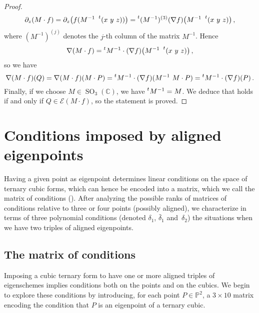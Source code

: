 \documentclass{amsart}
\theoremstyle{plain}
\theoremstyle{definition}
\newcommand{\C}{\mathbb{C}}
\newcommand{\p}{\mathbb{P}}
\newcommand{\SO}{\operatorname{SO}}
\newcommand{\Eig}[1]{\mathcal{E}\!\left( {#1} \right)}
\begin{document}
\begin{proof}
\begin{gather*}
  \partial_z (M\cdot f) = \partial_z \bigl( f(M^{-1} \ \prescript{t} {} (x \ y \ z)) \bigr) = \prescript{t} {}(M^{-1})^{(3)}(\nabla f) \bigl( M^{-1}\ \prescript{t} {} (x \ y \ z) \bigr) \,,
\end{gather*}
%
where $(M^{-1})^{(j)}$ denotes the $j$-th column of the matrix $M^{-1}$. Hence
%
\[
  \nabla (M \cdot f) = \prescript{t} {} M^{-1} \cdot (\nabla f) \bigl(M^{-1}\ \prescript{t} {} (x \ y \ z)\bigr) \,,
\]
%
so we have
%
\[
  \nabla (M \cdot f)(Q)=\nabla (M \cdot f)(M \cdot P)=
  \prescript{t} {} M^{-1} \cdot (\nabla f) (M^{-1}\ M \cdot P)=\prescript{t} {} M^{-1} \cdot (\nabla f)(P) \,.
\]
%
Finally, if we choose $M \in \SO_3(\C)$, we have
$\prescript{t} {} M^{-1}=M$. We deduce that
 holds if and only if $Q \in \Eig{M\cdot f}$, so the statement is proved.
\end{proof}


\section{Conditions imposed by aligned eigenpoints}
\label{conditions}

Having a given point as eigenpoint determines linear conditions on the space of ternary cubic forms, which can hence be encoded into a matrix, which we call the matrix of conditions (). 
After analyzing the possible ranks of matrices of conditions relative to three or four points (possibly aligned), we characterize in terms of three polynomial conditions (denoted $\delta_1$, $\bar{\delta}_1$ and~$\delta_2$) the situations when we have two triples of aligned eigenpoints.

\subsection{The matrix of conditions}

Imposing a cubic ternary form to have one or more aligned triples of eigenschemes implies conditions both on the points and on the cubics.
We begin to explore these conditions by introducing, for each point
$P \in \p^2$,
a $3 \times 10$ matrix encoding the condition that $P$ is an eigenpoint of a ternary cubic.
\end{document}
